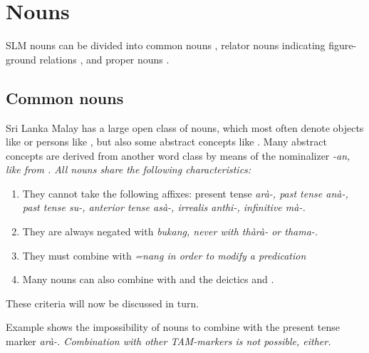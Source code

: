 \section{Nouns}\label{sec:wc:Nouns}
SLM nouns can be divided into common nouns , relator nouns indicating figure-ground relations , and proper nouns .

\subsection{Common nouns}\label{sec:wc:Commonnouns}
Sri Lanka Malay has a large open class of nouns, which most often denote objects like  or persons like , but also some abstract concepts like . Many abstract concepts are derived from another word class by means of the nominalizer \em -an\em, like  from .
All nouns share the following characteristics:

\begin{enumerate}
\item They cannot take the following affixes:
	present tense \em arà-\em,
	past tense \em anà-\em,
	past tense \em su-\em,
	anterior tense \em asà-\em,
	irrealis \em anthi-\em,
	infinitive \em mà-\em.
\item  They are always negated with \em bukang\em, never with \em thàrà- \em or \em thama-\em.
\item  They must combine with \em =nang \em in order to modify a predication
\item Many nouns can also combine with  and the deictics  and .
\end{enumerate}

These criteria will now be discussed in turn.

Example  shows the impossibility of nouns to combine with the present tense marker \em arà-\em. Combination with other TAM-markers is not possible, either.




